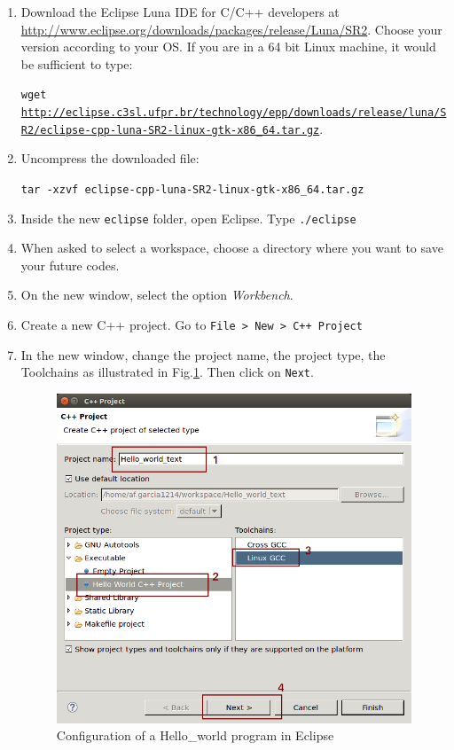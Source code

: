 \documentclass[12pt, oneside]{book}              %
\begin{document}
\begin{enumerate}
\item Download the Eclipse Luna IDE for C/C++ developers at \url{http://www.eclipse.org/downloads/packages/release/Luna/SR2}. Choose your version
according to your OS. If you are in a 64 bit Linux machine, it would be sufficient
to type:

\texttt{wget \url{http://eclipse.c3sl.ufpr.br/technology/epp/downloads/release/luna/SR2/eclipse-cpp-luna-SR2-linux-gtk-x86_64.tar.gz}}.

\item Uncompress the downloaded file:

\texttt{tar -xzvf eclipse-cpp-luna-SR2-linux-gtk-x86\_64.tar.gz}

\item Inside the new \texttt{eclipse} folder, open Eclipse. Type \texttt{./eclipse}

\item When asked to select a workspace, choose a directory where you want to save your
future codes.

\item On the new window, select the option \textit{Workbench}.

\item Create a new C++ project. Go to \texttt{File > New > C++ Project}

\item In the new window, change the project name, the project type, the Toolchains as
illustrated in Fig.\ref{fig:Eclipse_setting_project}. Then click on \texttt{Next}.

\begin{figure}[h]
\centering
\includegraphics[width=0.6\linewidth]{./Imags_Doc/Eclipse_setting_project}
\caption[Configuration of a Hello\_world program in Eclipse]{Configuration of a Hello\_world program in Eclipse}
\label{fig:Eclipse_setting_project}
\end{figure}


\end{enumerate}
\end{document}
